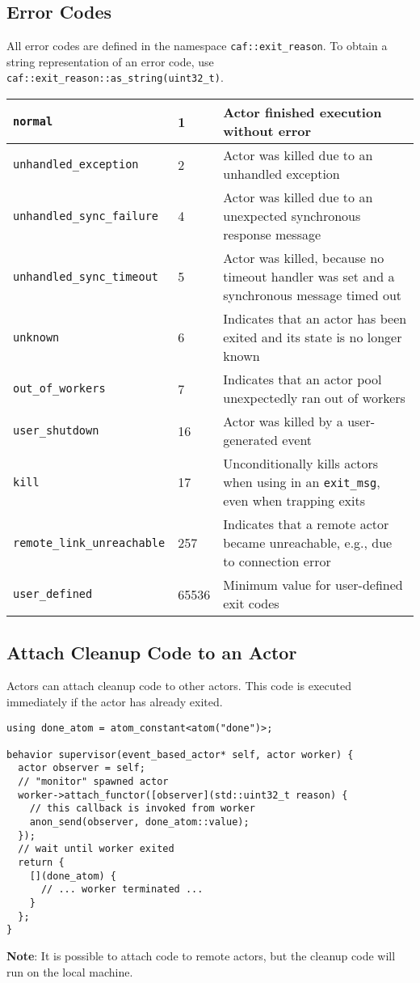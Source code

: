 \subsection{Error Codes}

All error codes are defined in the namespace \lstinline^caf::exit_reason^.
To obtain a string representation of an error code, use \lstinline^caf::exit_reason::as_string(uint32_t)^.

\begin{tabular*}{\textwidth}{m{}m{}m{}}
  \hline
  \lstinline^normal^ & 1 & Actor finished execution without error \\
  \hline
  \lstinline^unhandled_exception^ & 2 & Actor was killed due to an unhandled exception \\
  \hline
  \lstinline^unhandled_sync_failure^ & 4 & Actor was killed due to an unexpected synchronous response message \\
  \hline
  \lstinline^unhandled_sync_timeout^ & 5 & Actor was killed, because no timeout handler was set and a synchronous message timed out \\
  \hline
  \lstinline^unknown^ & 6 & Indicates that an actor has been exited and its state is no longer known \\
  \hline
  \lstinline^out_of_workers^ & 7 & Indicates that an actor pool unexpectedly ran out of workers \\
  \hline
  \lstinline^user_shutdown^ & 16 & Actor was killed by a user-generated event \\
  \hline
  \lstinline^kill^ & 17 & Unconditionally kills actors when using in an \lstinline^exit_msg^, even when trapping exits \\
  \hline
  \lstinline^remote_link_unreachable^ & 257 & Indicates that a remote actor became unreachable, e.g., due to connection error \\
  \hline
  \lstinline^user_defined^ & 65536 & Minimum value for user-defined exit codes \\
  \hline
\end{tabular*}

\subsection{Attach Cleanup Code to an Actor}

Actors can attach cleanup code to other actors.
This code is executed immediately if the actor has already exited.

\begin{lstlisting}
using done_atom = atom_constant<atom("done")>;

behavior supervisor(event_based_actor* self, actor worker) {
  actor observer = self;
  // "monitor" spawned actor
  worker->attach_functor([observer](std::uint32_t reason) {
    // this callback is invoked from worker
    anon_send(observer, done_atom::value);
  });
  // wait until worker exited
  return {
    [](done_atom) {
      // ... worker terminated ...
    }
  };
}
\end{lstlisting}

\textbf{Note}: It is possible to attach code to remote actors, but the cleanup code will run on the local machine.
